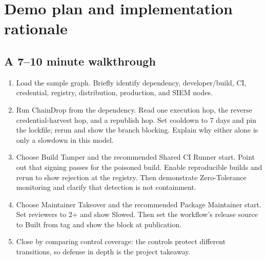 \documentclass[11pt,oneside]{book}
\begin{document}
\chapter{Demo plan and implementation rationale}
\section{A 7--10 minute walkthrough}
\begin{enumerate}
\item Load the sample graph. Briefly identify dependency, developer/build, CI, credential, registry, distribution, production, and SIEM nodes.
\item Run ChainDrop from the dependency. Read one execution hop, the reverse credential-harvest hop, and a republish hop. Set cooldown to 7 days and pin the lockfile; rerun and show the branch blocking. Explain why either alone is only a slowdown in this model.
\item Choose Build Tamper and the recommended Shared CI Runner start. Point out that signing passes for the poisoned build. Enable reproducible builds and rerun to show rejection at the registry. Then demonstrate Zero-Tolerance monitoring and clarify that detection is not containment.
\item Choose Maintainer Takeover and the recommended Package Maintainer start. Set reviewers to 2+ and show Slowed. Then set the workflow's release source to Built from tag and show the block at publication.
\item Close by comparing control coverage: the controls protect different transitions, so defense in depth is the project takeaway.
\end{enumerate}
\end{document}
